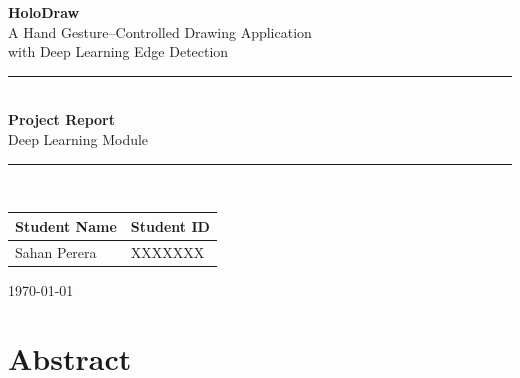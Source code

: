 \documentclass[12pt, a4paper]{article}
\begin{document}
\begin{titlepage}
    \centering
    \vspace*{2cm}

    {\Huge\bfseries HoloDraw}\\[0.5cm]
    {\Large A Hand Gesture--Controlled Drawing Application\\with Deep Learning Edge Detection}\\[2cm]

    \rule{\textwidth}{1pt}\\[0.5cm]

    {\large\bfseries Project Report}\\[0.3cm]
    {\large Deep Learning Module}\\[0.5cm]

    \rule{\textwidth}{1pt}\\[2cm]

    \begin{tabular}{l l}
        \textbf{Student Name}  & \textbf{Student ID} \\[4pt]
        \toprule
        Sahan Perera           & XXXXXXX             \\
        \bottomrule
    \end{tabular}

    \vfill

    {\large \today}
\end{titlepage}

\tableofcontents
\newpage

\section{Abstract}
\end{document}
